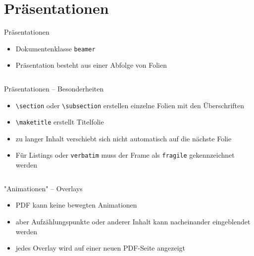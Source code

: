 \documentclass[presentation,aspectratio=169]{beamer}
\begin{document}
\section{Präsentationen}

\begin{frame}[fragile]{Präsentationen}
  \begin{itemize}
    \item Dokumentenklasse \verb|beamer|
    \item Präsentation besteht aus einer Abfolge von Folien
      \inputminted{latex}{codebeispiele/beamer-frame.tex}
  \end{itemize}
\end{frame}

\begin{frame}[fragile]{Präsentationen -- Besonderheiten}
  \begin{itemize}
    \item \verb|\section| oder \verb|\subsection| erstellen einzelne Folien mit den Überschriften
    \item \verb|\maketitle| erstellt Titelfolie
    \item zu langer Inhalt verschiebt sich nicht automatisch auf die nächste Folie
    \item Für Listings oder \verb|verbatim| muss der Frame als \verb|fragile| gekennzeichnet werden
      \inputminted{latex}{codebeispiele/frame-fragile.tex}
  \end{itemize}
\end{frame}

\begin{frame}[fragile]{"Animationen" -- Overlays}
  \begin{itemize}
    \item PDF kann keine bewegten Animationen
    \item aber Aufzählungspunkte oder anderer Inhalt kann nacheinander eingeblendet werden
    \item jedes Overlay wird auf einer neuen PDF-Seite angezeigt
      \inputminted{latex}{codebeispiele/beamer-overlays.tex}
  \end{itemize}
\end{frame}
\end{document}
